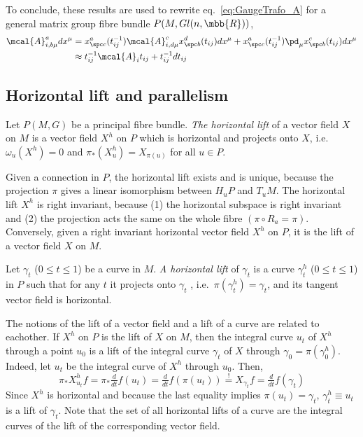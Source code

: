 \documentclass[10pt,reqno]{amsart}
\numberwithin{equation}{section}
\begin{document}
\begin{example}
	To conclude, these results are used to rewrite eq.\ 
	\eqref{eq:GaugeTrafo_A} for a general matrix group fibre bundle 
	$P(M,Gl(n,\mbb{R}))$,
	\begin{equation}
		\begin{split}
			\mcal{A}^a_{i,b\mu} dx^\mu &= x^a_{\spc c}(t_{ij}^{-1}) 
			\mcal{A}^c_{i,d\mu} x^d_{\spc b}(t_{ij}) dx^\mu + x^a_{\spc 
				c}(t_{ij}^{-1}) \pd_\mu x^c_{\spc b}(t_{ij}) dx^\mu \\
			&\approx t_{ij}^{-1} \mcal{A}_i t_{ij} + t_{ij}^{-1} 
			dt_{ij}
		\end{split}
	\end{equation}
\end{example}

\subsection{Horizontal lift and parallelism}

Let $P(M,G)$ be a principal fibre bundle. \emph{The horizontal 
	lift} of a vector field $X$ on $M$ is a vector field $X^h$ on 
$P$ which is horizontal and projects onto $X$, i.e.\ 
$\omega_u(X^h) = 0$ and $\pi_\ast(X^h_u) = X_{\pi(u)}$ for all $u 
\in P$.

Given a connection in $P$, the horizontal lift exists and is 
unique, because the projection $\pi$ gives a linear isomorphism 
between $H_uP$ and $T_uM$. The horizontal lift $X^h$ is right 
invariant, because (1) the horizontal subspace is right invariant 
and (2) the projection acts the same on the whole fibre $(\pi 
\circ R_a = \pi)$. Conversely, given a right invariant horizontal 
vector field $X^h$ on $P$, it is the lift of a vector field $X$ 
on $M$.

Let $\gamma_t$ ($0 \leq t \leq 1$) be a curve in $M$.  \emph{A 
	horizontal lift} of $\gamma_t$ is a curve $\gamma_t^h$ ($0 \leq 
t \leq 1$) in $P$ such that for any $t$ it projects onto 
$\gamma_t$ , i.e.\ $\pi(\gamma_t^h) = \gamma_t$, and its tangent 
vector field is horizontal.

The notions of the lift of a vector field and a lift of a curve 
are related to eachother. If $X^h$ on $P$ is the lift of $X$ on 
$M$, then the integral curve $u_t$ of $X^h$ through a point $u_0$ 
is a lift of the integral curve $\gamma_t$ of $X$ through 
$\gamma_0 = \pi(\gamma_0^h)$. Indeed, let $u_t$ be the integral 
curve of $X^h$ through $u_0$.  Then,
%
\begin{displaymath}
	\pi_\ast X^h_{u_t} f = \pi_\ast\tfrac{d}{dt}f(u_t) = 
	\tfrac{d}{dt} f(\pi(u_t)) \overset{!}{=} X_{\gamma_t}f = 
	\tfrac{d}{dt}f(\gamma_t)
\end{displaymath}
%
Since $X^h$ is horizontal and because the last equality implies 
$\pi(u_t) = \gamma_t$, $\gamma^h_t \equiv u_t$ is a lift of 
$\gamma_t$.  Note that the set of all horizontal lifts of a curve 
are the integral curves of the lift of the corresponding vector 
field.
\end{document}
